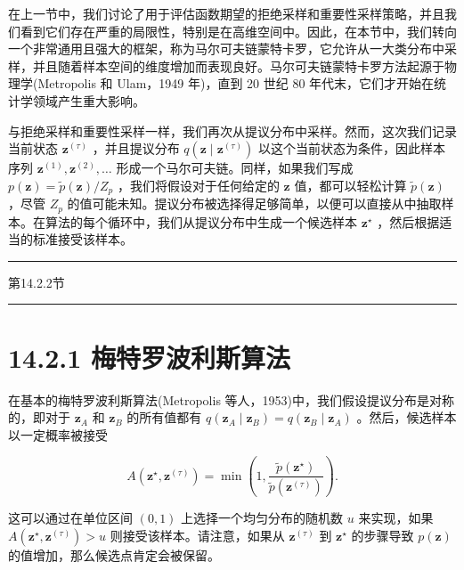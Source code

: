 \documentclass[10pt]{report}
\newcommand{\HRule}{\begin{center}\rule{0.9\linewidth}{0.2mm}\end{center}}
\begin{document}
在上一节中，我们讨论了用于评估函数期望的拒绝采样和重要性采样策略，并且我们看到它们存在严重的局限性，特别是在高维空间中。因此，在本节中，我们转向一个非常通用且强大的框架，称为马尔可夫链蒙特卡罗，它允许从一大类分布中采样，并且随着样本空间的维度增加而表现良好。马尔可夫链蒙特卡罗方法起源于物理学(Metropolis 和 Ulam，1949 年)，直到 20 世纪 80 年代末，它们才开始在统计学领域产生重大影响。

与拒绝采样和重要性采样一样，我们再次从提议分布中采样。然而，这次我们记录当前状态 \({\mathbf{z}}^{\left( \tau \right) }\) ，并且提议分布 \(q\left( {\mathbf{z} \mid  {\mathbf{z}}^{\left( \tau \right) }}\right)\) 以这个当前状态为条件，因此样本序列 \({\mathbf{z}}^{\left( 1\right) },{\mathbf{z}}^{\left( 2\right) },\ldots\) 形成一个马尔可夫链。同样，如果我们写成 \(p\left( \mathbf{z}\right)  = \widetilde{p}\left( \mathbf{z}\right) /{Z}_{p}\) ，我们将假设对于任何给定的 \(\mathbf{z}\) 值，都可以轻松计算 \(\widetilde{p}\left( \mathbf{z}\right)\) ，尽管 \({Z}_{p}\) 的值可能未知。提议分布被选择得足够简单，以便可以直接从中抽取样本。在算法的每个循环中，我们从提议分布中生成一个候选样本 \({\mathbf{z}}^{ \star  }\) ，然后根据适当的标准接受该样本。

\HRule

第14.2.2节

\HRule

\section*{14.2.1 梅特罗波利斯算法}

在基本的梅特罗波利斯算法(Metropolis 等人，1953)中，我们假设提议分布是对称的，即对于 \({\mathbf{z}}_{A}\) 和 \({\mathbf{z}}_{B}\) 的所有值都有 \(q\left( {{\mathbf{z}}_{A} \mid  {\mathbf{z}}_{B}}\right)  = q\left( {{\mathbf{z}}_{B} \mid  {\mathbf{z}}_{A}}\right)\) 。然后，候选样本以一定概率被接受

\[
A\left( {{\mathbf{z}}^{ \star  },{\mathbf{z}}^{\left( \tau \right) }}\right)  = \min \left( {1,\frac{\widetilde{p}\left( {\mathbf{z}}^{ \star  }\right) }{\widetilde{p}\left( {\mathbf{z}}^{\left( \tau \right) }\right) }}\right) . \tag{14.27}
\]

这可以通过在单位区间 \(\left( {0,1}\right)\) 上选择一个均匀分布的随机数 \(u\) 来实现，如果 \(A\left( {{\mathbf{z}}^{ \star  },{\mathbf{z}}^{\left( \tau \right) }}\right)  > u\) 则接受该样本。请注意，如果从 \({\mathbf{z}}^{\left( \tau \right) }\) 到 \({\mathbf{z}}^{ \star  }\) 的步骤导致 \(p\left( \mathbf{z}\right)\) 的值增加，那么候选点肯定会被保留。
\end{document}
